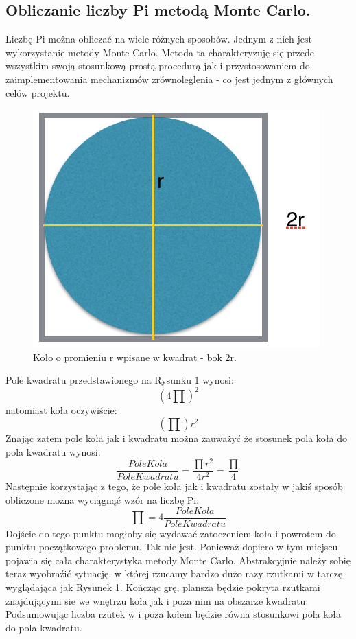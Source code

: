 \documentclass[a4paper,12pt]{article}		%
\begin{document}
\subsection{Obliczanie liczby Pi metodą Monte Carlo.} 
Liczbę Pi można obliczać na wiele różnych sposobów. Jednym z nich jest wykorzystanie metody Monte Carlo. Metoda ta charakteryzuję się przede wszystkim swoją stosunkową prostą procedurą jak i przystosowaniem do zaimplementowania mechanizmów zrównoleglenia - co jest jednym z głównych celów projektu.
\begin{figure}[h!]
\centering
\includegraphics[scale=0.5]{Resources/Kolo_rysunek.png}
\caption{Koło o promieniu r wpisane w kwadrat - bok 2r.}
\end{figure}
Pole kwadratu przedstawionego na Rysunku 1 wynosi:
 \[(4\prod)^{2}\]
 natomiast koła oczywiście:
 \[(\prod)r^{2}\]
 \newpage
 Znając zatem pole koła jak i kwadratu można zauważyć że stosunek pola koła do pola kwadratu wynosi:
\[ \frac{PoleKola}{PoleKwadratu}=\frac{\prod r^{2}}{4r^{2} }= \frac{\prod}{4}\]
Następnie korzystając z tego, że pole koła jak i kwadratu zostały w jakiś sposób obliczone można wyciągnąć wzór na liczbę Pi:
\[\prod =4\frac{PoleKola}{PoleKwadratu}\]
Dojście do tego punktu mogłoby się wydawać zatoczeniem koła i powrotem do punktu początkowego problemu. Tak nie jest. Ponieważ dopiero w tym miejscu pojawia się cała charakterystyka metody Monte Carlo. Abstrakcyjnie należy sobię teraz wyobraźić sytuację, w której rzucamy bardzo dużo razy rzutkami w tarczę wyglądająca jak Rysunek 1. Kończąc grę, plansza będzie pokryta rzutkami znajdującymi sie we wnętrzu koła jak i poza nim na obszarze kwadratu. Podsumowując liczba rzutek w i poza kołem będzie równa stosunkowi pola koła do pola kwadratu.
\end{document}
